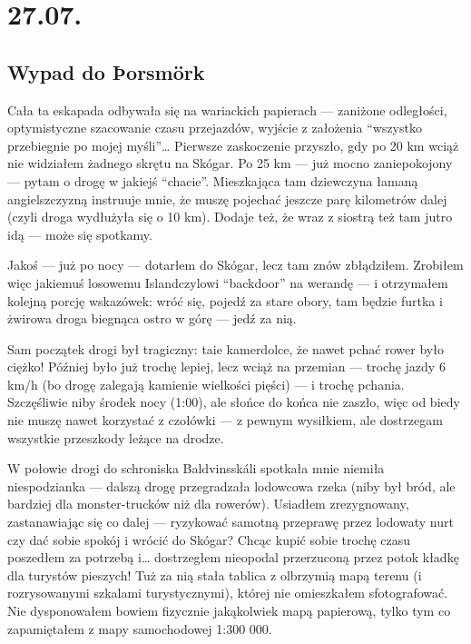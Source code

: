 \chapter*{27.07.}

\section*{Wypad do Þorsmörk}


Cała ta eskapada odbywała się na wariackich papierach --- zaniżone odległości, optymistyczne szacowanie czasu przejazdów, wyjście z założenia “wszystko przebiegnie po mojej myśli”… Pierwsze zaskoczenie przyszło, gdy po 20 km wciąż nie widziałem żadnego skrętu na Skógar. Po 25 km --- już mocno zaniepokojony --- pytam o drogę w jakiejś “chacie”. Mieszkająca tam dziewczyna łamaną angielszczyzną instruuje mnie, że muszę pojechać jeszcze parę kilometrów dalej (czyli droga wydłużyła się o 10 km). Dodaje też, że wraz z siostrą też tam jutro idą --- może się spotkamy.

Jakoś --- już po nocy --- dotarłem do Skógar, lecz tam znów zbłądziłem. Zrobiłem więc jakiemuś losowemu Islandczylowi “backdoor” na werandę --- i otrzymałem kolejną porcję wskazówek: wróć się, pojedź za stare obory, tam będzie furtka i żwirowa droga biegnąca ostro w górę --- jedź za nią.

Sam początek drogi był tragiczny: taie kamerdolce, że nawet pchać rower było ciężko! Później było już trochę lepiej, lecz wciąż na przemian --- trochę jazdy 6 km/h (bo drogę zalegają kamienie wielkości pięści) --- i trochę pchania. Szczęśliwie niby środek nocy (1:00), ale słońce do końca nie zaszło, więc od biedy nie muszę nawet korzystać z czołówki --- z pewnym wysiłkiem, ale dostrzegam wszystkie przeszkody leżące na drodze.

W połowie drogi do schroniska Baldvinsskáli spotkała mnie niemiła niespodzianka --- dalszą drogę przegradzała lodowcowa rzeka (niby był bród, ale bardziej dla monster-trucków niż dla rowerów). Usiadłem zrezygnowany, zastanawiając się co dalej --- ryzykować samotną przeprawę przez lodowaty nurt czy dać sobie spokój i wrócić do Skógar? Chcąc kupić sobie trochę czasu poszedłem za potrzebą i… dostrzegłem nieopodal przerzuconą przez potok kładkę dla turystów pieszych! Tuż za nią stała tablica z olbrzymią mapą terenu (i rozrysowanymi szkalami turystycznymi), której nie omieszkałem sfotografować. Nie dysponowałem bowiem fizycznie jakąkolwiek mapą papierową, tylko tym co zapamiętałem z mapy samochodowej 1:300 000.

